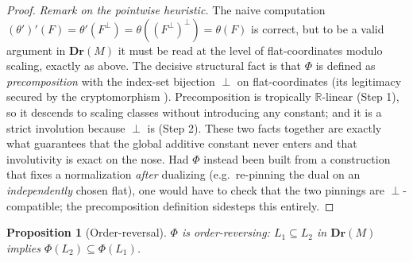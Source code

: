 \documentclass{article}
\newtheorem{proposition}[theorem]{Proposition}
\theoremstyle{definition}
\newcommand{\R}{\mathbb{R}}
\newcommand{\Dr}{\mathbf{Dr}}
\begin{document}
\begin{proof}
\smallskip
\noindent\emph{Remark on the pointwise heuristic.} The naive computation
$(\theta')'(F)=\theta'(F^{\perp})=\theta((F^{\perp})^{\perp})=\theta(F)$ is correct, but to be a
valid argument in $\Dr(M)$ it must be read at the level of flat-coordinates modulo scaling, exactly
as above. The decisive structural fact is that $\Phi$ is defined as \emph{precomposition} with the
index-set bijection $\perp$ on flat-coordinates (its legitimacy secured by the cryptomorphism
). Precomposition is tropically $\R$-linear (Step 1), so it descends to
scaling classes without introducing any constant; and it is a strict involution because $\perp$ is
(Step 2). These two facts together are exactly what guarantees that the global additive constant
never enters and that involutivity is exact on the nose. Had $\Phi$ instead been built from a
construction that fixes a normalization \emph{after} dualizing (e.g.\ re-pinning the dual on an
\emph{independently} chosen flat), one would have to check that the two pinnings are $\perp$-compatible;
the precomposition definition sidesteps this entirely.
\end{proof}

\begin{proposition}[Order-reversal]\label{prop:rev}
$\Phi$ is order-reversing: $L_1\subseteq L_2$ in $\Dr(M)$ implies $\Phi(L_2)\subseteq\Phi(L_1)$.
\end{proposition}
\end{document}
